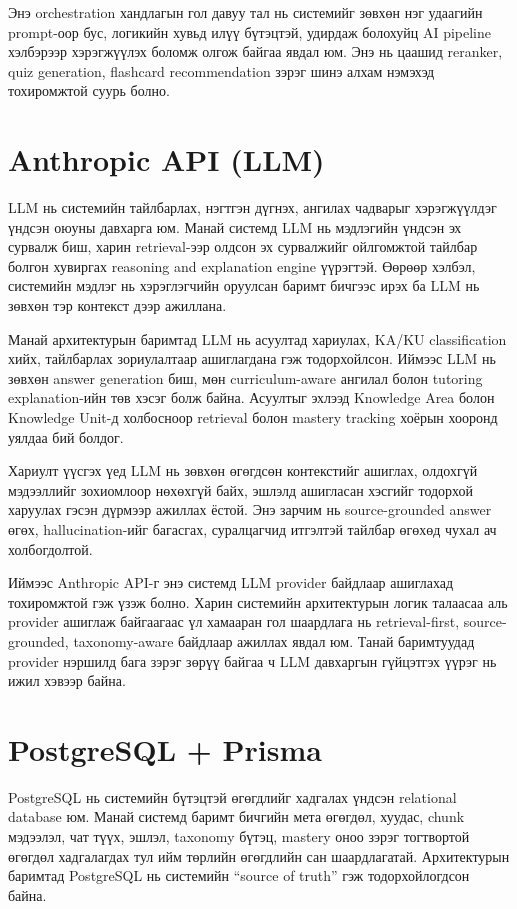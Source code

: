 \documentclass[12pt,A4]{report}
\newcommand{\eng}[1]{#1}
\begin{document}
Энэ orchestration хандлагын гол давуу тал нь системийг зөвхөн нэг удаагийн prompt-оор бус, логикийн хувьд илүү бүтэцтэй, удирдаж болохуйц \eng{AI pipeline} хэлбэрээр хэрэгжүүлэх боломж олгож байгаа явдал юм. Энэ нь цаашид \eng{reranker}, \eng{quiz generation}, \eng{flashcard recommendation} зэрэг шинэ алхам нэмэхэд тохиромжтой суурь болно.


\section{Anthropic API (LLM)}

\eng{LLM} нь системийн тайлбарлах, нэгтгэн дүгнэх, ангилах чадварыг хэрэгжүүлдэг үндсэн оюуны давхарга юм. Манай системд \eng{LLM} нь мэдлэгийн үндсэн эх сурвалж биш, харин retrieval-ээр олдсон эх сурвалжийг ойлгомжтой тайлбар болгон хувиргах \eng{reasoning and explanation engine} үүрэгтэй. Өөрөөр хэлбэл, системийн мэдлэг нь хэрэглэгчийн оруулсан баримт бичгээс ирэх ба \eng{LLM} нь зөвхөн тэр контекст дээр ажиллана.

Манай архитектурын баримтад \eng{LLM} нь асуултад хариулах, \eng{KA/KU classification} хийх, тайлбарлах зориулалтаар ашиглагдана гэж тодорхойлсон. Иймээс \eng{LLM} нь зөвхөн \eng{answer generation} биш, мөн curriculum-aware ангилал болон tutoring explanation-ийн төв хэсэг болж байна. Асуултыг эхлээд \eng{Knowledge Area} болон \eng{Knowledge Unit}-д холбосноор retrieval болон mastery tracking хоёрын хооронд уялдаа бий болдог.

Хариулт үүсгэх үед \eng{LLM} нь зөвхөн өгөгдсөн контекстийг ашиглах, олдохгүй мэдээллийг зохиомлоор нөхөхгүй байх, эшлэлд ашигласан хэсгийг тодорхой харуулах гэсэн дүрмээр ажиллах ёстой. Энэ зарчим нь source-grounded answer өгөх, hallucination-ийг багасгах, суралцагчид итгэлтэй тайлбар өгөхөд чухал ач холбогдолтой.

Иймээс \eng{Anthropic API}-г энэ системд \eng{LLM provider} байдлаар ашиглахад тохиромжтой гэж үзэж болно. Харин системийн архитектурын логик талаасаа аль provider ашиглаж байгаагаас үл хамааран гол шаардлага нь retrieval-first, source-grounded, taxonomy-aware байдлаар ажиллах явдал юм. Танай баримтуудад provider нэршилд бага зэрэг зөрүү байгаа ч \eng{LLM} давхаргын гүйцэтгэх үүрэг нь ижил хэвээр байна.


\section{PostgreSQL + Prisma}

\eng{PostgreSQL} нь системийн бүтэцтэй өгөгдлийг хадгалах үндсэн \eng{relational database} юм. Манай системд баримт бичгийн мета өгөгдөл, хуудас, \eng{chunk} мэдээлэл, чат түүх, эшлэл, taxonomy бүтэц, mastery оноо зэрэг тогтвортой өгөгдөл хадгалагдах тул ийм төрлийн өгөгдлийн сан шаардлагатай. Архитектурын баримтад \eng{PostgreSQL} нь системийн “source of truth” гэж тодорхойлогдсон байна.
\end{document}
